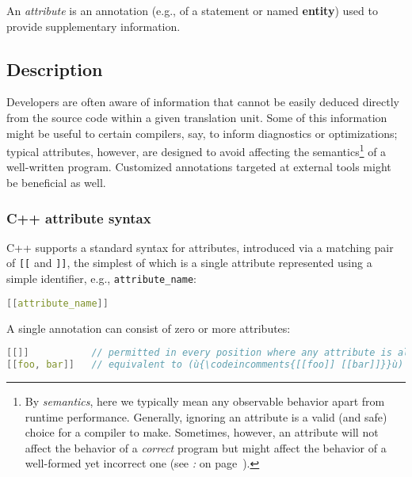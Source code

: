 

An \emph{attribute} is an annotation (e.g., of a statement or named
\textbf{entity}) used to provide supplementary information.

\subsection[Description]{Description}\label{description}

Developers are often aware of information that cannot be easily deduced directly
from the source code within a given translation unit. Some of this
information might be useful to certain compilers, say, to inform
diagnostics or optimizations; typical attributes, however, are designed
to avoid affecting the semantics{\cprotect\footnote{By \emph{semantics}, here
we typically mean any observable behavior apart from runtime
performance. Generally, ignoring an attribute is a valid (and safe)
choice for a compiler to make. Sometimes, however, an
attribute will not affect the behavior of a \emph{correct} program but might affect the behavior of a well-formed yet incorrect one (see
  {\it{}:} {\it{}} on page~\pageref{delineating-explicit-assumptions-in-code-to-achieve-better-optimizations}).}} of a
well-written program. Customized annotations targeted at external tools
might be beneficial as well.

\subsubsection[C++ attribute syntax]{C++ attribute syntax}\label{c++-attribute-syntax}

C++ supports a standard syntax for attributes, introduced via a matching
pair of \texttt{[[} and \texttt{]]}, the simplest of which is a single
attribute represented using a simple identifier, e.g.,
\texttt{attribute\_name}:

\begin{lstlisting}[language=C++]
[[attribute_name]]
\end{lstlisting}

\noindent A single annotation can consist of zero or more attributes:

\begin{lstlisting}[language=C++]
[[]]           // permitted in every position where any attribute is allowed
[[foo, bar]]   // equivalent to (ù{\codeincomments{[[foo]] [[bar]]}}ù)
\end{lstlisting}

